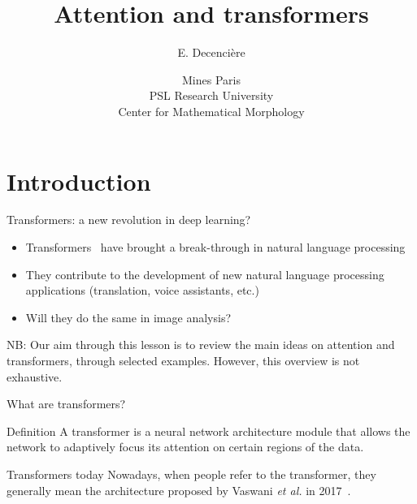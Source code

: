 \documentclass[xcolor=pdftex,dvipsnames,table,mathserif]{beamer}
\title{Attention and transformers}
\author{E. Decencière}
\date{Mines Paris\\
  PSL Research University\\
  Center for Mathematical Morphology
}
\begin{document}
\frame{\titlepage}


\section{Introduction}


\begin{frame}{Transformers: a new revolution in deep learning?}

\begin{itemize}
\item Transformers~\cite{vaswani_attention_2017} have brought a break-through in natural language processing
  \item They contribute to the development of new natural language processing applications (translation, voice assistants, etc.)
  \item Will they do the same in image analysis?
\end{itemize}

\vspace{1em}

\scriptsize{NB: Our aim through this lesson is to review the main ideas on attention and transformers, through selected examples. However, this overview is not exhaustive.}

\end{frame}


\begin{frame}{What are transformers?}

\begin{block}{Definition}
A transformer is a neural network architecture module that allows the network to \alert{adaptively focus its attention} on certain regions of the data.
\end{block}

\pause

\begin{alertblock}{Transformers today}
  Nowadays, when people refer to the transformer, they generally mean the architecture proposed by Vaswani \textit{et al.} in 2017~\cite{vaswani_attention_2017}.
\end{alertblock}

\end{frame}


\end{document}
